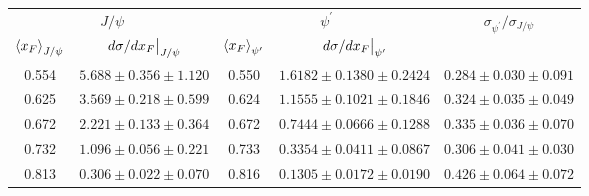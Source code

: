 \begin{tabular}{cc|cc|c}
\hline
\multicolumn{2}{c|}{$J/\psi$} &
  \multicolumn{2}{c|}{$\psi^{\prime}$} &
  \multirow{2}{*}{$\sigma_{\psi^\prime}/\sigma_{J/\psi}$} \\ \cline{1-4}
$\expval{x_F}_{J/\psi}$ &
  $\eval{d\sigma/dx_F}_{J/\psi}$ &
  $\expval{x_F}_{\psi^\prime}$ &
  $\eval{d\sigma/dx_F}_{\psi^\prime}$ &
   \\ \hline
0.554 & $5.688\pm0.356\pm1.120$ & 0.550 & $1.6182\pm0.1380\pm0.2424$ & $0.284\pm0.030\pm0.091$ \\
0.625 & $3.569\pm0.218\pm0.599$ & 0.624 & $1.1555\pm0.1021\pm0.1846$ & $0.324\pm0.035\pm0.049$ \\
0.672 & $2.221\pm0.133\pm0.364$ & 0.672 & $0.7444\pm0.0666\pm0.1288$ & $0.335\pm0.036\pm0.070$ \\
0.732 & $1.096\pm0.056\pm0.221$ & 0.733 & $0.3354\pm0.0411\pm0.0867$ & $0.306\pm0.041\pm0.030$ \\
0.813 & $0.306\pm0.022\pm0.070$ & 0.816 & $0.1305\pm0.0172\pm0.0190$ & $0.426\pm0.064\pm0.072$ \\ \hline
\end{tabular}
